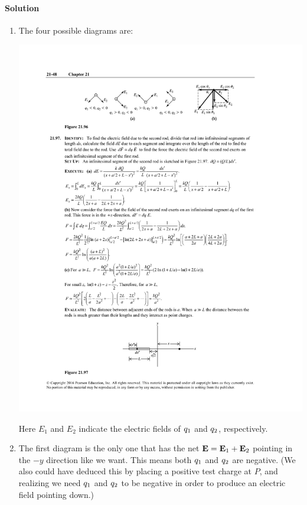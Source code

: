 \documentclass[11pt]{article}
\newenvironment{solution}
{
    \paragraph{Solution}
    \ignorespaces
}
{
    \bigskip
}
\begin{document}
\begin{solution}
	\begin{enumerate}
		\item The four possible diagrams are:
		
		\begin{center}
			\includegraphics[scale=1.5]{P21-96a}
		\end{center}
		
		Here $E_1$ and $E_2$ indicate the electric fields of $q_1$ and $q_2$, respectively.
		
		\item The first diagram is the only one that has the net $\mathbf{E} = \mathbf{E}_1 + \mathbf{E}_2$ pointing in the $-y$ direction like we want.  This means both $q_1$ and $q_2$ are negative.  (We also could have deduced this by placing a positive test charge at $P$, and realizing we need $q_1$ and $q_2$ to be negative in order to produce an electric field pointing down.)
		

\end{enumerate}
\end{solution}
\end{document}
